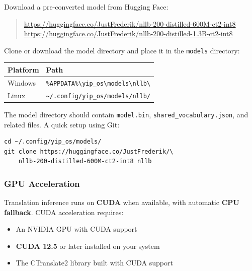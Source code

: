 \documentclass[10pt]{article}
\begin{document}
\noindent Download a pre-converted model from Hugging Face:

\begin{quote}
\url{https://huggingface.co/JustFrederik/nllb-200-distilled-600M-ct2-int8}\\
\url{https://huggingface.co/JustFrederik/nllb-200-distilled-1.3B-ct2-int8}
\end{quote}

\noindent Clone or download the model directory and place it in the \texttt{models} directory:

\begin{center}
{\small
\begin{tabular}{ll}
  \toprule
  \textbf{Platform} & \textbf{Path} \\
  \midrule
  Windows & \texttt{\%APPDATA\%\textbackslash yip\_os\textbackslash models\textbackslash nllb\textbackslash} \\
  Linux & \texttt{\~{}/.config/yip\_os/models/nllb/} \\
  \bottomrule
\end{tabular}
}
\end{center}

\noindent The model directory should contain \texttt{model.bin}, \texttt{shared\_vocabulary.json}, and related files. A quick setup using Git:

\begin{screenbox}
\begin{verbatim}
cd ~/.config/yip_os/models/
git clone https://huggingface.co/JustFrederik/\
    nllb-200-distilled-600M-ct2-int8 nllb
\end{verbatim}
\end{screenbox}

\subsubsection{GPU Acceleration}

Translation inference runs on \textbf{CUDA} when available, with automatic \textbf{CPU fallback}. CUDA acceleration requires:

\begin{itemize}[leftmargin=2em, nosep]
  \item An NVIDIA GPU with CUDA support
  \item \textbf{CUDA 12.5} or later installed on your system
  \item The CTranslate2 library built with CUDA support
\end{itemize}
\end{document}
